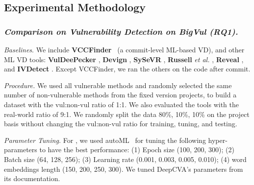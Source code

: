 \subsection{Experimental Methodology}
\label{method:sec}

%





\subsubsection{\bf \em Comparison on Vulnerability Detection on BigVul (RQ1).\\}

\emph{Baselines}. We include {\bf VCCFinder}~\cite{perl2015vccfinder}
(a commit-level ML-based VD), and other ML VD tools:
\textbf{VulDeePecker} \cite{li2018vuldeepecker}, \textbf{Devign}
\cite{zhou2019devign}, \textbf{SySeVR} \cite{li2021sysevr},
\textbf{Russell} {\em et al.}  \cite{russell2018automated},
\textbf{Reveal} \cite{chakraborty2021deep}, and {\bf IVDetect}
\cite{li2021vulnerability}. Except VCCFinder, we ran the others
on the code after commit. 

\emph{Procedure.}  We used all vulnerable methods and randomly selected
the same number of non-vulnerable methods from the fixed version
projects, to build a dataset with the vul:non-vul ratio of 1:1. We
also evaluated the tools with the real-world ratio of 9:1. We randomly split the
data 80\%, 10\%, 10\% on the project basis without changing the
vul:non-vul ratio for training, tuning, and testing.

\emph{Parameter Tuning.}  For {\tool}, we used
autoML~\cite{NNI} for tuning the following hyper-parameters to have the
best performance: (1) Epoch size (100, 200, 300); (2) Batch size (64,
128, 256); (3) Learning rate (0.001, 0.003, 0.005, 0.010); (4) word embeddings length (150, 200, 250, 300). We
tuned DeepCVA's parameters from its documentation.


